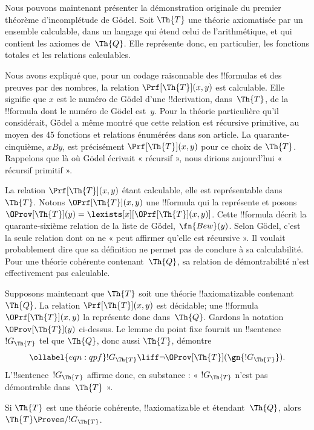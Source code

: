 \documentclass[../../../include/open-logic-section]{subfiles}
\begin{document}


Nous pouvons maintenant présenter la démonstration
originale du premier théorème d'incomplétude de
Gödel. Soit $\Th{T}$ une théorie axiomatisée par un
ensemble calculable, dans un langage qui étend
celui de l'arithmétique, et qui contient les axiomes
de~$\Th{Q}$. Elle représente donc, en particulier,
les fonctions totales et les relations calculables.

Nous avons expliqué que, pour un codage raisonnable
des !!{formula}s et des preuves par des nombres,
la relation $\Prf[\Th{T}](x,y)$ est calculable.
Elle signifie que $x$ est le numéro de Gödel d'une
!!{derivation}, dans~$\Th{T}$, de la !!{formula}
dont le numéro de Gödel est~$y$. Pour la théorie
particulière qu'il considérait, Gödel a même montré
que cette relation est récursive primitive, au moyen
des 45 fonctions et relations énumérées dans son
article. La quarante-cinquième, $x B y$, est
précisément $\Prf[\Th{T}](x,y)$ pour ce choix de
$\Th{T}$. Rappelons que là où Gödel écrivait
« récursif », nous dirions aujourd'hui « récursif
primitif ».

La relation $\Prf[\Th{T}](x,y)$ étant calculable,
elle est représentable dans~$\Th{T}$. Notons
$\OPrf[\Th{T}](x,y)$ une !!{formula} qui la
représente et posons
$\OProv[\Th{T}](y)=
\lexists[x][\OPrf[\Th{T}](x,y)]$.
Cette !!{formula} décrit la quarante-sixième
relation de la liste de Gödel, $\fn{Bew}(y)$.
Selon Gödel, c'est la seule relation dont on ne
« peut affirmer qu'elle est récursive ». Il voulait
probablement dire que sa définition ne permet pas
de conclure à sa calculabilité. Pour une théorie cohérente
contenant~$\Th{Q}$, sa relation de démontrabilité n'est effectivement
pas calculable.

Supposons maintenant que $\Th{T}$ soit une théorie
!!{axiomatizable} contenant~$\Th{Q}$. La relation
$\Prf[\Th{T}](x,y)$ est décidable; une
!!{formula}~$\OPrf[\Th{T}](x,y)$ la représente
donc dans~$\Th{Q}$. Gardons la notation
$\OProv[\Th{T}](y)$ ci-dessus. Le lemme du point
fixe fournit un !!{sentence}~$!G_\Th{T}$ tel
que $\Th{Q}$, donc aussi $\Th{T}$, démontre
\begin{equation}
\ollabel{eqn:qpf}
!G_\Th{T}\liff\lnot\OProv[\Th{T}](\gn{!G_\Th{T}}).
\end{equation}
L'!!{sentence}~$!G_\Th{T}$ affirme donc, en
substance : « $!G_\Th{T}$ n'est pas démontrable
dans~$\Th{T}$ ».

\begin{lem}
Si $\Th{T}$ est une théorie cohérente,
!!{axiomatizable} et étendant~$\Th{Q}$, alors
$\Th{T}\Proves/ !G_\Th{T}$.
\end{lem}
\end{document}
